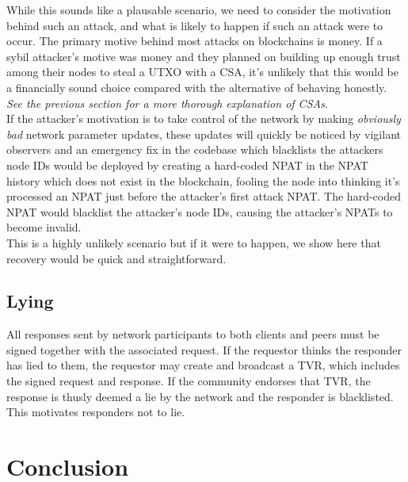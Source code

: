 \documentclass{article}
\begin{document}
While this sounds like a plausable scenario, we need to consider the motivation behind such an attack, and what is likely to happen if such an attack were to occur. The primary motive behind most attacks on blockchains is money. If a sybil attacker's motive was money and they planned on building up enough trust among their nodes to steal a UTXO with a CSA, it's unlikely that this would be a financially sound choice compared with the alternative of behaving honestly. \textit{See the previous section for a more thorough explanation of CSAs}. \\

If the attacker's motivation is to take control of the network by making \textit{obviously bad} network parameter updates, these updates will quickly be noticed by vigilant observers and an emergency fix in the codebase which blacklists the attackers node IDs would be deployed by creating a hard-coded NPAT in the NPAT history which does not exist in the blockchain, fooling the node into thinking it's processed an NPAT just before the attacker's first attack NPAT. The hard-coded NPAT would blacklist the attacker's node IDs, causing the attacker's NPATs to become invalid. \\

This is a highly unlikely scenario but if it were to happen, we show here that recovery would be quick and straightforward.

\subsection{Lying}

All responses sent by network participants to both clients and peers must be signed together with the associated request. If the requestor thinks the responder has lied to them, the requestor may create and broadcast a TVR, which includes the signed request and response. If the community endorses that TVR, the response is thusly deemed a lie by the network and the responder is blacklisted. This motivates responders not to lie.

\section{Conclusion}
\end{document}
